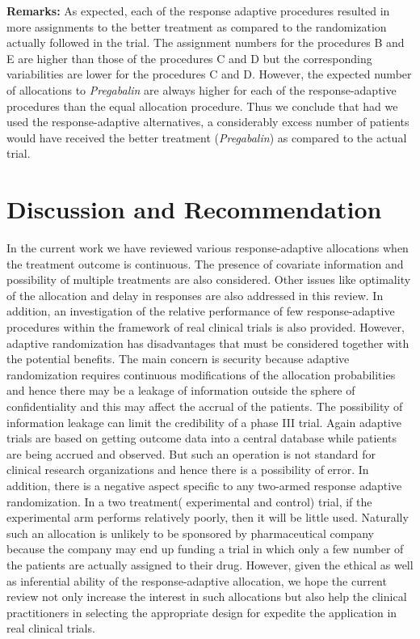 \noindent\textbf{Remarks:} As expected, each of the response adaptive procedures resulted in more assignments to the better treatment as compared to the randomization actually followed in the trial. The assignment numbers for the procedures B and E are  higher than those of the procedures C and D  but the corresponding variabilities are lower for the procedures C and D. However, the expected number of allocations to \textit{Pregabalin} are always higher  for  each of  the response-adaptive procedures than the equal allocation procedure. Thus we conclude that had we used the  response-adaptive alternatives,  a considerably excess number of patients would have received the better treatment (\textit{Pregabalin}) as compared to the actual trial.

\section{Discussion and Recommendation}

In the current work we have reviewed various response-adaptive allocations when the treatment outcome is continuous. The presence of covariate information and  possibility of multiple treatments  are also considered. Other issues like optimality of the allocation and delay in responses are also addressed in this review. In addition, an investigation of the relative performance of few response-adaptive procedures within the framework of real clinical trials  is also provided. However, adaptive randomization has disadvantages that must be considered together with the potential benefits\cite{81,82}. The main  concern is security because adaptive randomization requires continuous modifications of the allocation probabilities and hence there may be a leakage of information  outside the sphere of confidentiality and this may affect the accrual of the patients.  The possibility of information leakage can limit the credibility of a phase III trial. Again adaptive trials are based on getting outcome data into a central database while patients are being accrued and observed. But such an operation is not standard for clinical research organizations  and hence there is a possibility of error. In addition, there is a negative aspect specific to any  two-armed response adaptive randomization. In a two treatment( experimental and control) trial, if the experimental arm performs relatively poorly, then it
will be little used. Naturally such an allocation is unlikely to
be sponsored by pharmaceutical company because the company may end up funding a trial in which only a few number of the patients are actually assigned to their drug.  However, given the ethical as well as inferential ability of the response-adaptive allocation, we hope the current review  not only  increase the interest in such allocations but also help the clinical practitioners in selecting the appropriate design for expedite the application in real clinical trials.\\

